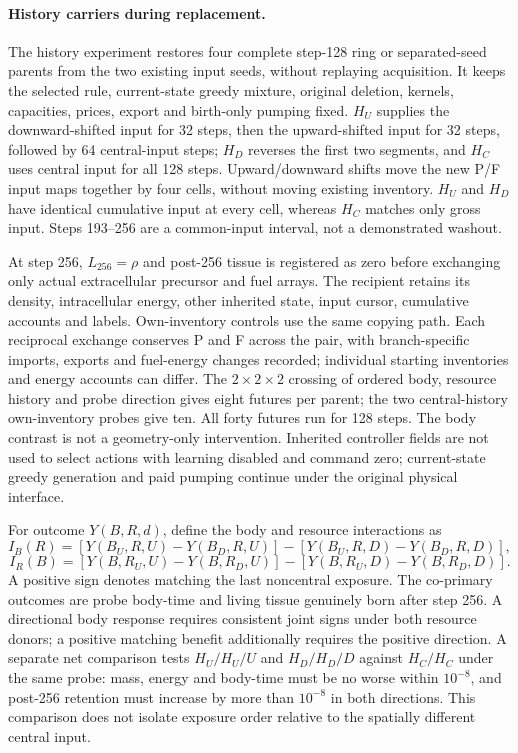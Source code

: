 \paragraph{History carriers during replacement.}
The history experiment restores four complete step-128 ring or separated-seed parents from the two existing input seeds, without replaying acquisition. It keeps the selected rule, current-state greedy mixture, original deletion, kernels, capacities, prices, export and birth-only pumping fixed. $H_U$ supplies the downward-shifted input for 32 steps, then the upward-shifted input for 32 steps, followed by 64 central-input steps; $H_D$ reverses the first two segments, and $H_C$ uses central input for all 128 steps. Upward/downward shifts move the new P/F input maps together by four cells, without moving existing inventory. $H_U$ and $H_D$ have identical cumulative input at every cell, whereas $H_C$ matches only gross input. Steps 193--256 are a common-input interval, not a demonstrated washout.

At step 256, $L_{256}=\rho$ and post-256 tissue is registered as zero before exchanging only actual extracellular precursor and fuel arrays. The recipient retains its density, intracellular energy, other inherited state, input cursor, cumulative accounts and labels. Own-inventory controls use the same copying path. Each reciprocal exchange conserves P and F across the pair, with branch-specific imports, exports and fuel-energy changes recorded; individual starting inventories and energy accounts can differ. The $2\times2\times2$ crossing of ordered body, resource history and probe direction gives eight futures per parent; the two central-history own-inventory probes give ten. All forty futures run for 128 steps. The body contrast is not a geometry-only intervention. Inherited controller fields are not used to select actions with learning disabled and command zero; current-state greedy generation and paid pumping continue under the original physical interface.

For outcome $Y(B,R,d)$, define the body and resource interactions as
\[
 I_B(R)=[Y(B_U,R,U)-Y(B_D,R,U)]-[Y(B_U,R,D)-Y(B_D,R,D)],
\]
\[
 I_R(B)=[Y(B,R_U,U)-Y(B,R_D,U)]-[Y(B,R_U,D)-Y(B,R_D,D)].
\]
A positive sign denotes matching the last noncentral exposure. The co-primary outcomes are probe body-time and living tissue genuinely born after step 256. A directional body response requires consistent joint signs under both resource donors; a positive matching benefit additionally requires the positive direction. A separate net comparison tests $H_U/H_U/U$ and $H_D/H_D/D$ against $H_C/H_C$ under the same probe: mass, energy and body-time must be no worse within $10^{-8}$, and post-256 retention must increase by more than $10^{-8}$ in both directions. This comparison does not isolate exposure order relative to the spatially different central input.

